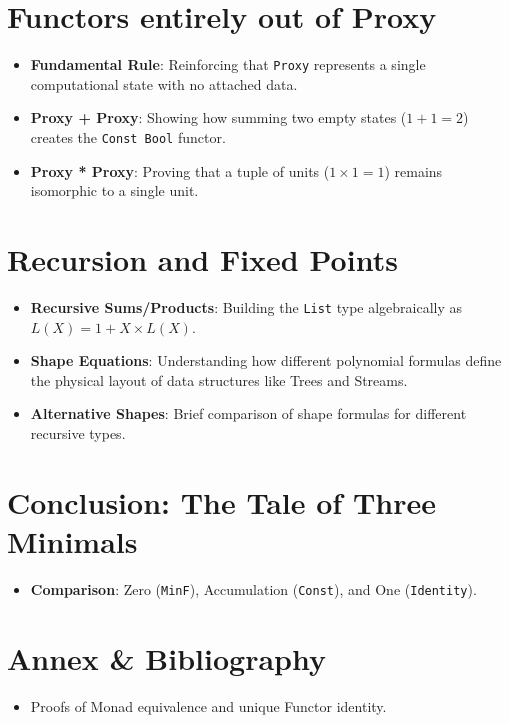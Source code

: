 \documentclass[12pt,a4paper]{article}
\begin{document}
\section{Functors entirely out of Proxy}
\begin{itemize}
    \item \textbf{Fundamental Rule}: Reinforcing that \texttt{Proxy} represents a single computational state with no attached data.
    \item \textbf{Proxy + Proxy}: Showing how summing two empty states ($1 + 1 = 2$) creates the \texttt{Const Bool} functor.
    \item \textbf{Proxy * Proxy}: Proving that a tuple of units ($1 \times 1 = 1$) remains isomorphic to a single unit.
\end{itemize}

\section{Recursion and Fixed Points}
\begin{itemize}
    \item \textbf{Recursive Sums/Products}: Building the \texttt{List} type algebraically as $L(X) = 1 + X \times L(X)$.
    \item \textbf{Shape Equations}: Understanding how different polynomial formulas define the physical layout of data structures like Trees and Streams.
    \item \textbf{Alternative Shapes}: Brief comparison of shape formulas for different recursive types.
\end{itemize}

\section{Conclusion: The Tale of Three Minimals}
\begin{itemize}
    \item \textbf{Comparison}: Zero (\texttt{MinF}), Accumulation (\texttt{Const}), and One (\texttt{Identity}).
\end{itemize}

\section{Annex \& Bibliography}
\begin{itemize}
    \item Proofs of Monad equivalence and unique Functor identity.
\end{itemize}
\end{document}
